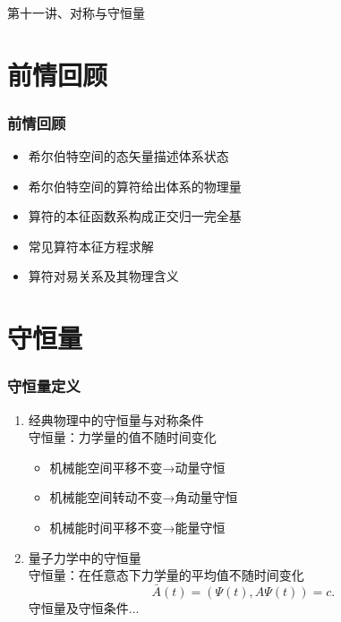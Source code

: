 \begin{frame}
    \frametitle{}
    \begin{center}
    { {\huge 第十一讲、对称与守恒量}}
    \end{center}    
\end{frame}


\section{前情回顾}

\begin{frame}
    \frametitle{前情回顾}
    \begin{itemize}
        \item 希尔伯特空间的态矢量描述体系状态
        \item 希尔伯特空间的算符给出体系的物理量
        \item 算符的本征函数系构成正交归一完全基
        \item 常见算符本征方程求解
        \item 算符对易关系及其物理含义 
    \end{itemize}   
\end{frame} 

\section{守恒量}
\begin{frame} 
    \frametitle{守恒量定义}
    \begin{enumerate}
        \item  经典物理中的守恒量与对称条件\\
                守恒量：力学量的值不随时间变化\\
                \begin{itemize}
                    \item 机械能空间平移不变→动量守恒
                    \item 机械能空间转动不变→角动量守恒
                    \item 机械能时间平移不变→能量守恒
                \end{itemize}
        \item  量子力学中的守恒量\\
                守恒量：在任意态下力学量的平均值不随时间变化\\
                $$ \bar{A}(t)=(\Psi(t), A\Psi(t)) =c.  $$
                守恒量及守恒条件... 
    \end{enumerate}
\end{frame} 



